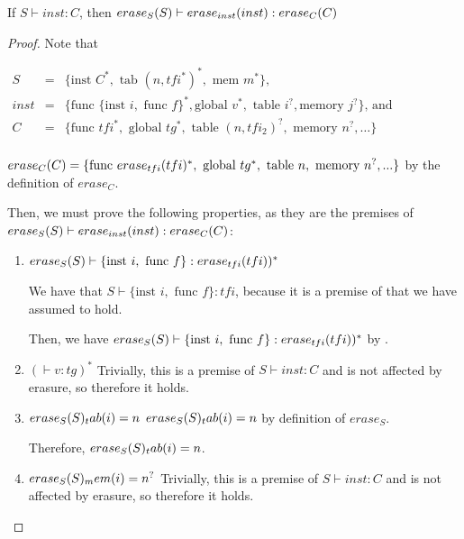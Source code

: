 \begin{lemma}{}
    If $S \vdash inst : C$, then $\erase[S]{S} \vdash \erase[inst]{inst} : \erase[C]{C}$
\end{lemma}
\begin{proof}
    Note that

    \begin{math}
        \begin{array}{rcl}
            S &=& \{\text{inst } C^{*}, \text{ tab } (n,tfi^{*})^{*}, \text{ mem } m^{*}\} \text{,} \\
            inst &=& \{\text{func } \{\text{inst } i, \text{ func } f\}^{*}, \text{global } v^{*}, \text{ table } i^{?}, \text{memory } j^{?}\} \text{, and} \\
            C &=& \{\text{func } tfi^{*}, \text{ global } tg^{*}, \text{ table } (n,tfi_2)^{?}, \text{ memory } n^{?}, \dots\} \\
        \end{array}
    \end{math}

    $\erase[C]{C}=\{\text{func } \erase[tfi]{tfi}^{*}, \text{ global } tg^{*}, \text{ table } n, \text{ memory } n^{?}, ...\}$ by the definition of $erase_C$.

    Then, we must prove the following properties, as they are the premises of $\erase[S]{S} \vdash \erase[inst]{inst} : \erase[C]{C}$:
    \begin{enumerate}
        \item $\erase[S]{S} \vdash \{\text{inst } i, \text{ func } f\} : \erase[tfi]{tfi})^{*}$

        We have that $S \vdash \{\text{inst } i, \text{ func } f\} : tfi$, because it is a premise of  that we have assumed to hold.

        Then, we have $\erase[S]{S} \vdash \{\text{inst } i, \text{ func } f\} : \erase[tfi]{tfi})^{*}$ by .

        \item $(\vdash v : tg)^{*}$
        Trivially, this is a premise of $S \vdash inst : C$ and is not affected by erasure, so therefore it holds.

        \item $\erase[S]{S}_tab(i)=n$
        $\erase[S]{S}_tab(i)=n$ by definition of $erase_S$.

        Therefore, $\erase[S]{S}_tab(i)=n$.

        \item $\erase[S]{S}_mem(i)=n^{?}$
        Trivially, this is a premise of $S \vdash inst : C$ and is not affected by erasure, so therefore it holds.
    \end{enumerate}
\end{proof}

